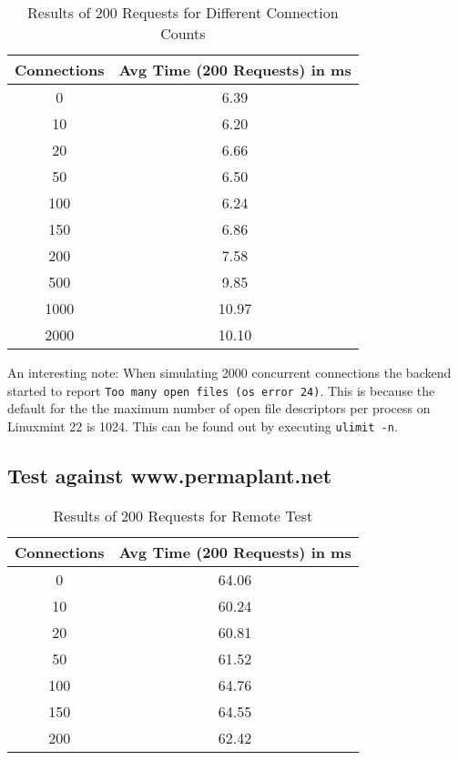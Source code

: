\documentclass[final,draft,oneside]{vutinfth}
\begin{document}
\begin{table}[h!]
    \centering
    \begin{tabular}{cc}
        \toprule
        \textbf{Connections} & \textbf{Avg Time (200 Requests) in ms} \\
        \midrule
        0 & 6.39 \\
        10 & 6.20 \\
        20 & 6.66 \\
        50 & 6.50 \\
        100 & 6.24 \\
        150 & 6.86 \\
        200 & 7.58 \\
        500 & 9.85 \\
        1000 & 10.97 \\
        2000 & 10.10 \\
        \bottomrule
    \end{tabular}
    \caption{Results of 200 Requests for Different Connection Counts}
\end{table}

An interesting note: When simulating 2000 concurrent connections the backend started to report \texttt{Too many open files (os error 24)}.
This is because the default for the the maximum number of open file descriptors per process on Linuxmint 22 is 1024.
This can be found out by executing \texttt{ulimit -n}.


\subsection{Test against www.permaplant.net}

\begin{table}[h!]
    \centering
    \begin{tabular}{cc}
        \toprule
        \textbf{Connections} & \textbf{Avg Time (200 Requests) in ms} \\
        \midrule
        0 & 64.06 \\
        10 & 60.24 \\
        20 & 60.81 \\
        50 & 61.52 \\
        100 & 64.76 \\
        150 & 64.55 \\
        200 & 62.42 \\
        \bottomrule
    \end{tabular}
    \caption{Results of 200 Requests for Remote Test}
\end{table}
\end{document}
